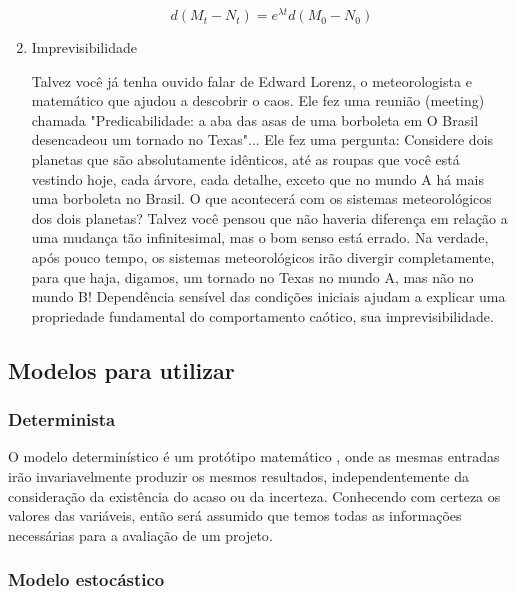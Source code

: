 \documentclass[11pt, letterpaper, portuguese]{article}
\begin{document}
\begin{enumerate}
    \begin{equation*}
    d ( M_{t} − N_{t} ) = e^{ \lambda  t}  d ( M_{0} − N_{0} )  
    \end{equation*}

    \vspace{0.5 cm}

    \item{Imprevisibilidade}
    
    \par{Talvez você já tenha ouvido falar de Edward Lorenz, o meteorologista e matemático que ajudou a descobrir o caos. Ele fez uma reunião (meeting) chamada "Predicabilidade: a aba das asas de uma borboleta em O Brasil desencadeou um tornado no Texas"... Ele fez uma pergunta: Considere dois planetas que são absolutamente idênticos, até as roupas que você está vestindo hoje, cada árvore, cada detalhe, exceto que no mundo A há mais uma borboleta no Brasil. O que acontecerá com os sistemas meteorológicos dos dois planetas? Talvez você pensou que não haveria diferença em relação a uma mudança tão infinitesimal, mas o bom senso está errado. Na verdade, após pouco tempo, os sistemas meteorológicos irão divergir completamente, para que haja, digamos, um tornado no Texas no mundo A, mas não no mundo B! Dependência sensível das condições iniciais ajudam a explicar uma propriedade fundamental do comportamento caótico, sua imprevisibilidade. \cite{garfinkel_shevtsov_guo_2017}}
    \end{enumerate}
\subsection{Modelos para utilizar}



\subsubsection{Determinista}

\par{O modelo determinístico é um protótipo matemático \cite{Witenberg_1995}, onde as mesmas entradas irão invariavelmente produzir os mesmos resultados, independentemente da consideração da existência do acaso ou da incerteza. Conhecendo com certeza os valores das variáveis, então será assumido que temos todas as informações necessárias para a avaliação de um projeto\cite{ramos_2019}.}

 \subsubsection{Modelo estocástico}
\end{document}
